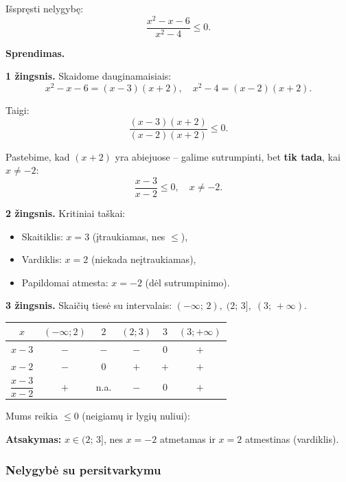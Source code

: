 \begin{example}
Išspręsti nelygybę:
\[
    \frac{x^2 - x - 6}{x^2 - 4} \leq 0.
\]

\textbf{Sprendimas.}

\textbf{1 žingsnis.} Skaidome dauginamaisiais:
\[
    x^2 - x - 6 = (x-3)(x+2), \quad x^2 - 4 = (x-2)(x+2).
\]

Taigi:
\[
    \frac{(x-3)(x+2)}{(x-2)(x+2)} \leq 0.
\]

Pastebime, kad $(x+2)$ yra abiejuose -- galime sutrumpinti, bet \textbf{tik tada}, kai $x \neq -2$:
\[
    \frac{x-3}{x-2} \leq 0, \quad x \neq -2.
\]

\textbf{2 žingsnis.} Kritiniai taškai:
\begin{itemize}
    \item Skaitiklis: $x = 3$ (įtraukiamas, nes $\leq$),
    \item Vardiklis: $x = 2$ (niekada neįtraukiamas),
    \item Papildomai atmesta: $x = -2$ (dėl sutrumpinimo).
\end{itemize}

\textbf{3 žingsnis.} Skaičių tiesė su intervalais: $(-\infty;\,2),\;(2;\,3],\;(3;\,+\infty)$.

\begin{center}
\begin{tabular}{c|ccccc}
$x$ & $(-\infty;2)$ & $2$ & $(2;3)$ & $3$ & $(3;+\infty)$ \\
\hline
$x-3$ & $-$ & $-$ & $-$ & $0$ & $+$ \\
$x-2$ & $-$ & $0$ & $+$ & $+$ & $+$ \\
\hline
$\dfrac{x-3}{x-2}$ & $+$ & n.a. & $-$ & $0$ & $+$ \\
\end{tabular}
\end{center}

Mums reikia $\leq 0$ (neigiamų ir lygių nuliui):

\textbf{Atsakymas:} $x \in (2;\, 3]$, nes $x = -2$ atmetamas ir $x = 2$ atmestinas (vardiklis).
\end{example}

\subsubsection*{Nelygybė su persitvarkymu}

